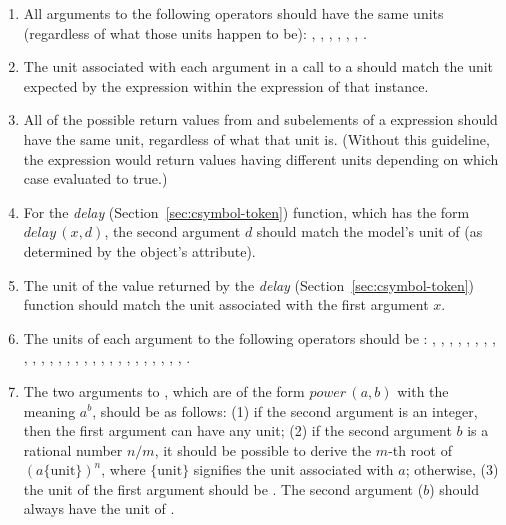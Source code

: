 \begin{enumerate}

\item All arguments to the following operators should have the same
  units (regardless of what those units happen to be):
  , , ,  ,
  , , .

\item The unit associated with each argument in a call to a
  \FunctionDefinition should match the unit expected by the
   expression within the  expression of
  that \FunctionDefinition instance.


\item All of the possible return values from  and
   subelements of a  expression
  should have the same unit, regardless of what that unit is.
  (Without this guideline, the  expression would
  return values having different units depending on which case
  evaluated to true.)

\item For the \emph{delay} 
  (Section~\ref{sec:csymbol-token}) function, which has the form
  $\textit{delay}\,(x, d)$, the second argument $d$ should match
  the model's unit of  (as determined by the \Model
  object's  attribute).

\item The unit of the value returned by the \emph{delay}
   (Section~\ref{sec:csymbol-token}) function
  should match the unit associated with the first argument $x$.

\item The units of each argument to the following operators should
  be : , , ,
  , , , ,
  , , , ,
  , , , ,
  , , , ,
  , , , ,
  , , ,
  , .

\item The two arguments to , which are of the form
  $\textit{power}\,(a,b)$ with the meaning $a^b$, should be as
  follows: (1) if the second argument is an integer, then the
  first argument can have any unit; (2) if the second argument $b$
  is a rational number $n/m$, it should be possible to derive the
  $m$-th root of $(a \{\text{unit}\})^n$, where $\{\text{unit}\}$
  signifies the unit associated with $a$; otherwise, (3) the unit
  of the first argument should be .  The second
  argument ($b$) should always have the unit of .


\end{enumerate}
